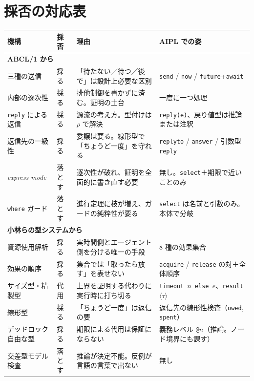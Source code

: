 \documentclass[11pt,a4paper]{ltjsarticle}
\theoremstyle{definition}
\theoremstyle{remark}
\begin{document}
\section{採否の対応表}
\label{sec:table}

\begin{center}
\small
\begin{longtable}{p{}p{}p{}p{}}
\toprule
機構 & 採否 & 理由 & AIPL での姿 \\
\midrule
\endhead
\multicolumn{4}{l}{\textbf{ABCL/1 から}}\\
\midrule
三種の送信 & 採る & 「待たない／待つ／後で」は設計上必要な区別 &
  \texttt{send} / \texttt{now} / \texttt{future}+\texttt{await} \\
内部の逐次性 & 採る & 排他制御を書かずに済む。証明の土台 & 一度に一つ処理 \\
\texttt{reply} による返信 & 採る & 源流の考え方。型付けは $\rho$ で解決 &
  \texttt{reply(e)}、戻り値型は推論または注釈 \\
返信先の一級性 & 採る & 委譲は要る。線形型で「ちょうど一度」を守れる &
  \texttt{replyto} / \texttt{answer} / 引数型 \texttt{reply} \\
\addlinespace
\textit{express mode} & 落とす & 逐次性が破れ、証明を全面的に書き直す必要 &
  無し。\texttt{select}＋期限で近いことのみ \\
\texttt{where} ガード & 落とす & 進行定理に枝が増え、ガードの純粋性が要る &
  \texttt{select} は名前と引数のみ。本体で分岐 \\
\midrule
\multicolumn{4}{l}{\textbf{小林らの型システムから}}\\
\midrule
資源使用解析 & 採る & 実時間側とエージェント側を分ける唯一の手段 &
  8 種の効果集合 \\
効果の順序 & 採る & 集合では「取ったら放す」を表せない &
  \texttt{acquire} / \texttt{release} の対＋全体順序 \\
サイズ型・精製型 & 代用 & 上界を証明する代わりに実行時に打ち切る &
  \texttt{timeout $n$ else $e$}、\texttt{result}$\langle\tau\rangle$ \\
線形型 & 採る & 「ちょうど一度」は返信の要 &
  返信先の線形性検査（\texttt{owed}, \texttt{spent}） \\
デッドロック自由な型 & 採る & 期限による代用は保証にならない &
  義務レベル \texttt{@$n$}（推論。ノード境界にも課す） \\
\addlinespace
交差型モデル検査 & 落とす & 推論が決定不能。反例が言語の言葉で出ない & 無し \\

\end{longtable}
\end{center}
\end{document}

